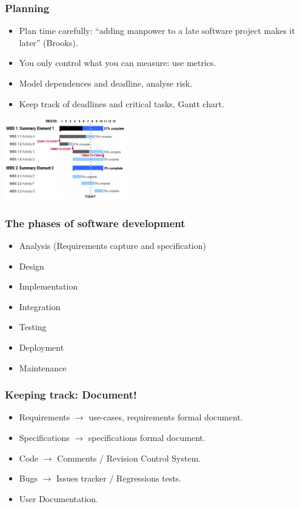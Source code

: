\documentclass[10pt]{beamer}
\begin{document}
\begin{frame}[fragile]
  \frametitle{Planning}
  \begin{itemize}
  \item Plan time carefully: ``adding manpower to a late software project
    makes it later'' (Brooks).
  \item You only control what you can measure: use metrics.
  \item Model dependences and deadline, analyse risk.
  \item Keep track of deadlines and critical tasks, Gantt chart.
  \end{itemize}
  \begin{center}
    \includegraphics[width=0.4\textwidth]{gantt_chart}
  \end{center}
\end{frame}

\begin{frame}[fragile]
  \frametitle{The phases of software development}
  \begin{itemize}
  \item Analysis (Requirements capture and specification)
  \item Design
  \item Implementation
  \item Integration
  \item Testing
  \item Deployment
  \item Maintenance
  \end{itemize}
\end{frame}

\begin{frame}[fragile]
  \frametitle{Keeping track: Document!}
  \begin{itemize}
  \item Requirements $\longrightarrow$ use-cases, requirements formal document.
  \item Specifications $\longrightarrow$ specifications formal document.
  \item Code $\longrightarrow$ Comments / Revision Control System.
  \item Bugs $\longrightarrow$ Issues tracker / Regressions tests.
  \item User Documentation.
  \end{itemize}
\end{frame}
\end{document}
